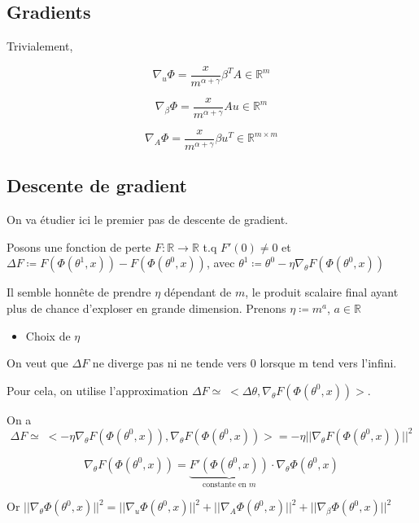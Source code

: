 \documentclass[a4paper, 11pt, french]{article}
\begin{document}
	\subsection*{Gradients}
	
	Trivialement,
	
	\[ \nabla_u \Phi = \frac{x}{m^{\alpha + \gamma}} \beta^T A \in \mathbb{R}^m\]
	
	\[ \nabla_{\beta} \Phi = \frac{x}{m^{\alpha + \gamma}} A u \in \mathbb{R}^m\]
	
	\[ \nabla_A \Phi = \frac{x}{m^{\alpha + \gamma}} \beta u^T \in \mathbb{R}^{m \times m}\]
	
	\subsection*{Descente de gradient}
	
	On va étudier ici le premier pas de descente de gradient.
	
	Posons une fonction de perte $F : \mathbb{R} \rightarrow \mathbb{R}$ t.q $F'(0) \neq 0$ et 
	$\Delta F \coloneqq F(\Phi(\theta^1, x)) - F(\Phi(\theta^0, x))$, avec 
	$\theta^1 \coloneqq \theta^0 - \eta \nabla_{\theta} F(\Phi(\theta^0, x))$

	Il semble honnête de prendre $\eta$ dépendant de $m$, le produit scalaire final ayant plus de chance d'exploser en grande dimension. Prenons $\eta \coloneqq m^a$, $a \in \mathbb{R}$ \\
	
	\begin{itemize}	
		\item Choix de $\eta$  \\
	\end{itemize}
		
	On veut que $\Delta F$ ne diverge pas ni ne tende vers 0 lorsque m tend vers l'infini.
	
	Pour cela, on utilise l'approximation 
	$\Delta F \simeq \; < \Delta \theta, \nabla_{\theta} F(\Phi(\theta^0, x)) >$.
	
	On a 
	\[
		\Delta F \simeq \; < -\eta \nabla_{\theta} F(\Phi(\theta^0, x)) , \nabla_{\theta} F(\Phi(\theta^0, x)) > = -\eta || \nabla_{\theta} F(\Phi(\theta^0, x)) ||^2
	\]
	
	\[
		\nabla_{\theta} F(\Phi(\theta^0, x)) = 
		\underbrace{F'(\Phi(\theta^0, x))}_\text{constante en $m$} 
		\cdot \nabla_{\theta} \Phi(\theta^0, x)
	\]
	
	Or $ || \nabla_{\theta} \Phi(\theta^0, x) ||^2 = || \nabla_{u} \Phi(\theta^0, x) ||^2
	+ || \nabla_{A} \Phi(\theta^0, x) ||^2 + || \nabla_{\beta} \Phi(\theta^0, x) ||^2 $ \\
	
\end{document}
